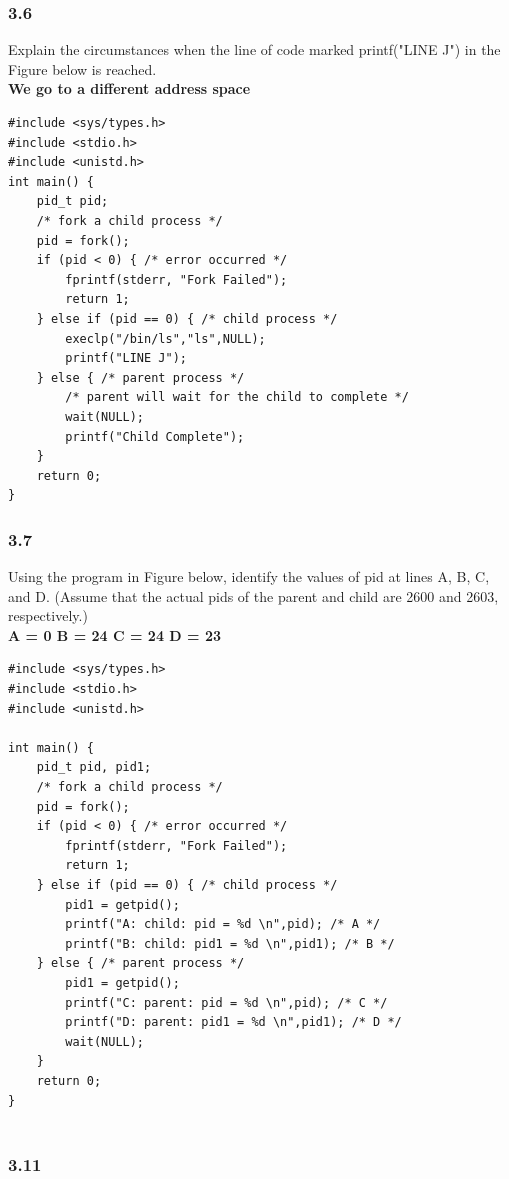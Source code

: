 \documentclass[a4paper,10pt,titlepage]{report}
\begin{document}
\subsubsection{3.6}
Explain the circumstances when the line of code marked printf("LINE J") in the Figure below is reached.\\
\textbf{We go to a different address space} \\
\begin{lstlisting}[frame=single]
#include <sys/types.h>
#include <stdio.h>
#include <unistd.h>
int main() {
    pid_t pid;
    /* fork a child process */
    pid = fork();
    if (pid < 0) { /* error occurred */
        fprintf(stderr, "Fork Failed");
        return 1;
    } else if (pid == 0) { /* child process */
        execlp("/bin/ls","ls",NULL);
        printf("LINE J");
    } else { /* parent process */
        /* parent will wait for the child to complete */
        wait(NULL);
        printf("Child Complete");
    }
    return 0;
}
\end{lstlisting}
\subsubsection{3.7}
Using the program in Figure below, identify the values of pid at lines A, B, C, and D. (Assume that the actual pids of the parent and child are 2600 and 2603, respectively.) \\
\textbf{
A = 0
B = 24
C = 24
D = 23
}
\begin{lstlisting}[frame=single]
#include <sys/types.h>
#include <stdio.h>
#include <unistd.h>
 
int main() {
    pid_t pid, pid1;
    /* fork a child process */
    pid = fork();
    if (pid < 0) { /* error occurred */
        fprintf(stderr, "Fork Failed");
        return 1;
    } else if (pid == 0) { /* child process */
        pid1 = getpid();
        printf("A: child: pid = %d \n",pid); /* A */
        printf("B: child: pid1 = %d \n",pid1); /* B */
    } else { /* parent process */
        pid1 = getpid();
        printf("C: parent: pid = %d \n",pid); /* C */
        printf("D: parent: pid1 = %d \n",pid1); /* D */
        wait(NULL);
    }
    return 0;
}
   
\end{lstlisting}
\subsubsection{3.11}
\end{document}
